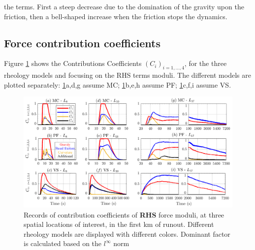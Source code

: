 \documentclass{article}
\begin{document}
the terms. First a steep decrease due to the domination of the gravity upon the friction, then a bell-shaped increase when the friction stops the dynamics.

\subsection{Force contribution coefficients}
Figure \ref{fig:Colima-Ci_1} shows the Contributions Coefficients $(C_i)_{i=1,\dots,4}$, for the three rheology models and focusing on the RHS terms moduli. The different models are plotted separately: \ref{fig:Colima-Ci_1}a,d,g assume MC; \ref{fig:Colima-Ci_1}b,e,h assume PF; \ref{fig:Colima-Ci_1}c,f,i assume VS.
\begin{figure}[H]
         \centering
        \includegraphics[width=1\textwidth]{BAF_VolcanDeColima/ForceContrib/Ci1_total.png}
        \caption{Records of contribution coefficients of \textbf{RHS} force moduli, at three spatial locations of interest, in the first km of runout. Different rheology models are displayed with different colors. Dominant factor is calculated based on the $l^\infty$ norm}
        \label{fig:Colima-Ci_1}
\end{figure}
\newpage
\end{document}
